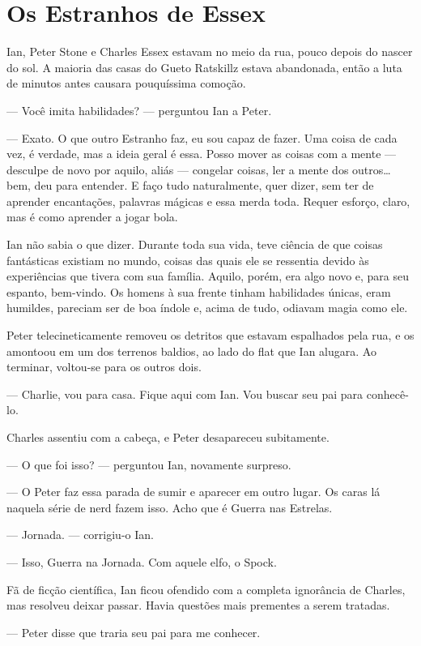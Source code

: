 \chapter{Os Estranhos de Essex}

Ian, Peter Stone e Charles Essex estavam no meio da rua, pouco depois do nascer
do sol. A maioria das casas do Gueto Ratskillz estava abandonada, então a luta
de minutos antes causara pouquíssima comoção.

--- Você imita habilidades? --- perguntou Ian a Peter.

--- Exato. O que outro Estranho faz, eu sou capaz de fazer. Uma coisa de cada
vez, é verdade, mas a ideia geral é essa. Posso mover as coisas com a mente ---
desculpe de novo por aquilo, aliás --- congelar coisas, ler a mente dos
outros\ldots\,bem, deu para entender. E faço tudo naturalmente, quer dizer, sem
ter de aprender encantações, palavras mágicas e essa merda toda. Requer
esforço, claro, mas é como aprender a jogar bola.

Ian não sabia o que dizer. Durante toda sua vida, teve ciência de que coisas
fantásticas existiam no mundo, coisas das quais ele se ressentia devido às
experiências que tivera com sua família. Aquilo, porém, era algo novo e, para
seu espanto, bem-vindo. Os homens à sua frente tinham habilidades únicas, eram
humildes, pareciam ser de boa índole e, acima de tudo, odiavam magia como ele.

Peter telecineticamente removeu os detritos que estavam espalhados pela rua, e
os amontoou em um dos terrenos baldios, ao lado do flat que Ian alugara. Ao
terminar, voltou-se para os outros dois.

--- Charlie, vou para casa. Fique aqui com Ian. Vou buscar seu pai para
conhecê-lo.

Charles assentiu com a cabeça, e Peter desapareceu subitamente.

--- O que foi isso? --- perguntou Ian, novamente surpreso.

--- O Peter faz essa parada de sumir e aparecer em outro lugar. Os caras lá
naquela série de nerd fazem isso. Acho que é Guerra nas Estrelas.

--- Jornada. --- corrigiu-o Ian.

--- Isso, Guerra na Jornada. Com aquele elfo, o Spock.

Fã de ficção científica, Ian ficou ofendido com a completa ignorância de
Charles, mas resolveu deixar passar. Havia questões mais prementes a serem
tratadas.

--- Peter disse que traria seu pai para me conhecer.

